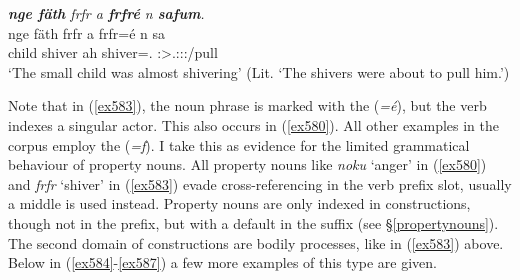 \begin{exe}
	\ex \emph{\textbf{nge fäth} frfr a \textbf{frfré} n \textbf{safum}.}\\
	\gll nge fäth frfr a frfr=é n sa\\
	child \Dim{} shiver ah shiver=\Erg.\Nsg{} \Imn{} \Stsg:\Sbj>\Tsg.\Masc:\Obj:\Rpst:\Pfv/pull\\
	\trans `The small child was almost shivering' (Lit. `The shivers were about to pull him.')
	\label{ex583}
\end{exe}

Note that in (\ref{ex583}), the noun phrase is marked with the   (\emph{=é}), but the verb indexes a singular actor. This also occurs in (\ref{ex580}). All other examples in the corpus employ the   (\emph{=f}). I take this as evidence for the limited grammatical behaviour of property nouns. All property nouns \textendash{} like \emph{noku} `anger' in (\ref{ex580}) and \emph{frfr} `shiver' in (\ref{ex583}) \textendash{} evade cross-referencing in the verb prefix slot, usually a middle is used instead. Property nouns are only indexed in  constructions, though not in the prefix, but with a default \Stsg{} in the suffix (see \S{}\ref{propertynouns}).\\

The second domain of  constructions are bodily processes, like in (\ref{ex583}) above. Below in (\ref{ex584}-\ref{ex587}) a few more examples of this type are given.

